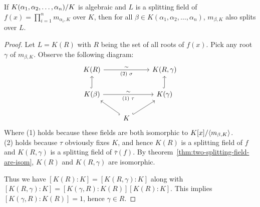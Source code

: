 \begin{lemma} \label{lemma:element-in-alg-ext-splits}
  If ${K(\alpha_1, \alpha_2, \dots, \alpha_n)}/{K}$ is algebraic and $L$ is a splitting field of
  $f(x) = \prod_{i=1}^n m_{\alpha_i, K}$
  over $K$, then for all $\beta \in K(\alpha_1, \alpha_2, \dots, \alpha_n)$,
  $m_{\beta, K}$ also splits over $L$.

  \begin{proof}
    Let $L = K(R)$ with $R$ being the set of all roots of $f(x)$. Pick any root $\gamma$ of $m_{\beta, K}$.
    Observe the following diagram:
  \[
    \begin{tikzcd}
      K(R) \arrow[rr, "\sim", "\text{(2) } \sigma"'] & & K(R, \gamma) \\
      K(\beta) \arrow[u, hookrightarrow] \arrow[rr, "\sim", "\text{(1) } \tau"'] & & K(\gamma) \arrow[u, hookrightarrow] \\
      & K \arrow[ur, hookrightarrow] \arrow[ul, hookrightarrow] &
    \end{tikzcd}
  \]
  Where (1) holds because these fields are both isomorphic to ${K[x]}/{\langle m_{\beta, K} \rangle}$. \\
  (2) holds because $\tau$ obviously fixes $K$, and hence $K(R)$ is a splitting field of $f$
  and $K(R, \gamma)$ is a splitting field of $\bar\tau(f)$. By theorem~\ref{thm:two-splitting-field-are-isom},
  $K(R)$ and $K(R, \gamma)$ are isomorphic.

  Thus we have $[K(R): K] = [K(R, \gamma): K]$ along with
  $[K(R, \gamma): K] = [K(\gamma, R): K(R)][K(R): K]$.
  This implies $[K(\gamma, R): K(R)] = 1$, hence $\gamma \in R$.
  \end{proof}
\end{lemma}

